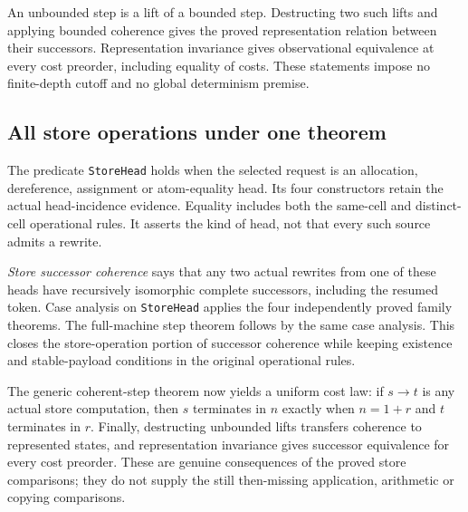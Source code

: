 


An unbounded step is a lift of a bounded step. Destructing two such lifts
and applying bounded coherence gives the proved representation relation
between their successors. Representation invariance gives observational
equivalence at every cost preorder, including equality of costs. These
statements impose no finite-depth cutoff and no global determinism premise.



\subsection{All store operations under one theorem}

The predicate \texttt{StoreHead} holds when the selected request is an
allocation, dereference, assignment or atom-equality head. Its four constructors
retain the actual head-incidence evidence. Equality includes both the same-cell
and distinct-cell operational rules. It asserts the kind of head, not that
every such source admits a rewrite.


\emph{Store successor coherence} says that any two actual rewrites from
one of these heads have recursively isomorphic complete successors, including
the resumed token. Case analysis on \texttt{StoreHead} applies the four
independently proved family theorems. The full-machine step theorem follows
by the same case analysis. This closes the store-operation portion of
successor coherence while keeping existence and stable-payload conditions
in the original operational rules.



The generic coherent-step theorem now yields a uniform cost law:
if $s\to t$ is any actual store computation, then $s$ terminates in $n$
exactly when $n=1+r$ and $t$ terminates in $r$. Finally, destructing unbounded
lifts transfers coherence to represented states, and representation invariance
gives successor equivalence for every cost preorder. These are genuine
consequences of the proved store comparisons; they do not supply the still
then-missing application, arithmetic or copying comparisons.


